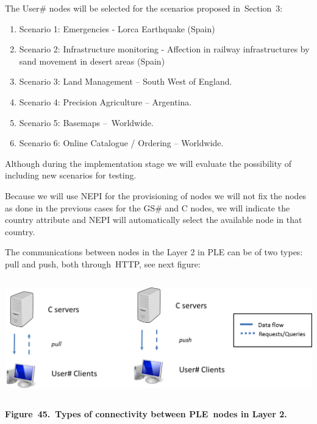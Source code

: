 \documentclass[a4paper]{article}
\newcounter{saveenum}
\newcommand\liststyleLFOxxxix{%
\renewcommand\theenumi{\arabic{enumi}}
\renewcommand\theenumii{\alph{enumii}}
\renewcommand\theenumiii{\roman{enumiii}}
\renewcommand\theenumiv{\arabic{enumiv}}
\renewcommand\labelenumi{\theenumi.}
\renewcommand\labelenumii{\theenumii.}
\renewcommand\labelenumiii{\theenumiii.}
\renewcommand\labelenumiv{\theenumiv.}
}
\begin{document}
\bigskip

The User\# nodes will be selected for the scenarios proposed
in\ Section\ 3:

\liststyleLFOxxxix
\setcounter{saveenum}{\value{enumi}}
\begin{enumerate}
\setcounter{enumi}{\value{saveenum}}
\item Scenario 1: Emergencies - Lorca Earthquake (Spain)
\item Scenario 2: Infrastructure monitoring - Affection in railway
infrastructures by sand movement in desert areas (Spain)
\item Scenario 3: Land Management -- South West of England.
\item Scenario 4: Precision Agriculture -- Argentina.
\item Scenario 5: Basemaps --\ Worldwide.
\item Scenario 6: Online Catalogue / Ordering -- Worldwide.
\end{enumerate}
Although during the implementation stage we will evaluate the
possibility of including new scenarios for testing.


\bigskip

Because we will use NEPI for the provisioning of nodes we will not fix
the nodes as done in the previous cases for the GS\# and C nodes, we
will indicate the country attribute and NEPI will automatically select
the available node in that country.


\bigskip

The communications between nodes in the Layer 2 in PLE can be of two
types: pull and push, both through\ HTTP, see next figure:

{\centering 
\includegraphics[width=6.18082in,height=2.02427in]{out-img53.png} \par}

{\centering\bfseries
Figure\ 45.\ Types of connectivity between PLE\ nodes in Layer 2.
\par}


\bigskip
\end{document}
